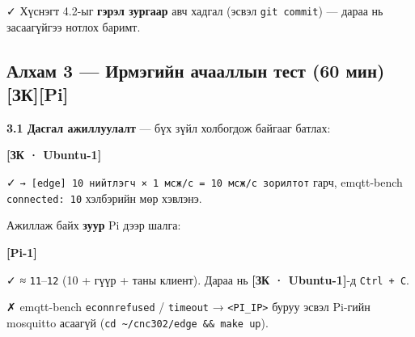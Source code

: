 ✓ Хүснэгт 4.2-ыг \textbf{гэрэл зургаар} авч хадгал (эсвэл \texttt{git\ commit}) --- дараа нь засаагүйгээ нотлох баримт.

\hypertarget{ux430ux43bux445ux430ux43c-3-ux438ux440ux43cux44dux433ux438ux439ux43d-ux430ux447ux430ux430ux43bux43bux44bux43d-ux442ux435ux441ux442-60-ux43cux438ux43d-ux437ux43api}{%
\subsection{Алхам 3 --- Ирмэгийн ачааллын тест (60 мин) {[}ЗК{]}{[}Pi{]}}\label{ux430ux43bux445ux430ux43c-3-ux438ux440ux43cux44dux433ux438ux439ux43d-ux430ux447ux430ux430ux43bux43bux44bux43d-ux442ux435ux441ux442-60-ux43cux438ux43d-ux437ux43api}}

\textbf{3.1 Дасгал ажиллуулалт} --- бүх зүйл холбогдож байгааг батлах:

\textbf{{[}ЗК · Ubuntu-1{]}}

\begin{Shaded}
\begin{Highlighting}[]
\OperatorTok{\textless{}}\OperatorTok{\textgreater{}}
\end{Highlighting}
\end{Shaded}

✓ \texttt{→\ {[}edge{]}\ 10\ нийтлэгч\ ×\ 1\ мсж/\allowbreak{}с\ =\allowbreak{}\ 10\ мсж/\allowbreak{}с\ зорилтот} гарч, emqtt-bench \texttt{connected:\ 10} хэлбэрийн мөр хэвлэнэ.

Ажиллаж байх \textbf{зуур} Pi дээр шалга:

\textbf{{[}Pi-1{]}}

\begin{Shaded}
\begin{Highlighting}[]
\KeywordTok{;} 
\end{Highlighting}
\end{Shaded}

✓ ≈ \texttt{11}--\texttt{12} (10 + гүүр + таны клиент). Дараа нь \textbf{{[}ЗК · Ubuntu-1{]}}-д \texttt{Ctrl\ +\ C}.

✗ emqtt-bench \texttt{econnrefused} / \texttt{timeout} → \texttt{\textless{}PI\_\allowbreak{}IP\textgreater{}} буруу эсвэл Pi-гийн mosquitto асаагүй (\texttt{cd\ \textasciitilde{}/cnc302/edge\ \&\&\ make\ up}).

